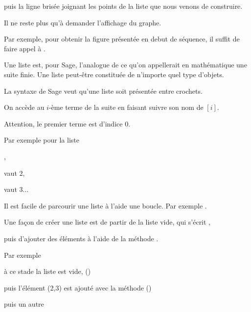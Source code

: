 puis la ligne brisée joignant les points de la liste que nous venons de construire.

Il ne reste plus qu'à demander l'affichage du graphe.

\change

Par exemple, pour obtenir la figure présentée en debut de séquence, il suffit de faire appel à
.



\diapo

Une liste est, pour Sage, l'analogue de ce qu'on appellerait en mathématique une suite finie. 
Une liste peut-être constituée de n'importe quel type d'objets.

\change

La syntaxe de Sage veut qu'une liste soit présentée entre crochets.

\change

On accède au $i$-ème terme de la suite en faisant suivre son nom de $[i]$.

Attention, le premier terme est d'indice $0$.

Par exemple pour la liste  

,

 vaut $2$,

 vaut $3$...

\change 

Il est facile de parcourir une liste à l'aide une boucle. Par exemple 
. 



\change

Une façon de créer une liste est de partir de la liste vide, 
qui s'écrit \codeinline{[]},

\change
puis d'ajouter des éléments à l'aide de la méthode .

\change

 Par exemple 

à ce stade la liste  est vide, ()

puis  l'élément (2,3) est ajouté avec la méthode  ()

puis un autre %


